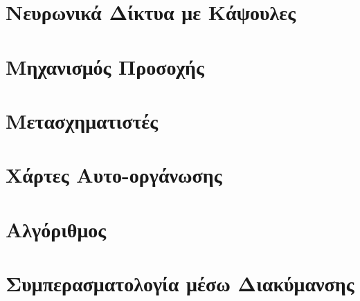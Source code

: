 \section{Νευρωνικά Δίκτυα με Κάψουλες}
\section{Μηχανισμός Προσοχής}
\section{Μετασχηματιστές}
\section{Χάρτες Αυτο-οργάνωσης}
\label{sec:_SOM}
\section{Αλγόριθμος }
\label{sec:_EM}
\section{Συμπερασματολογία μέσω Διακύμανσης}
